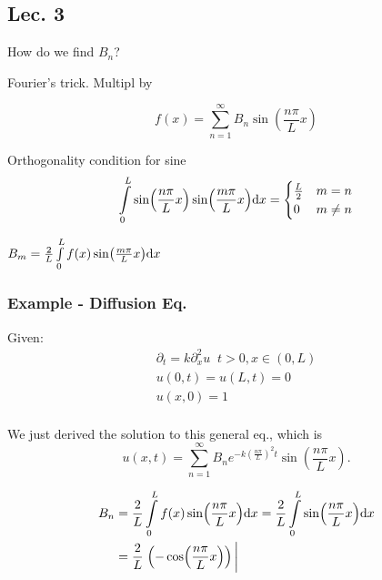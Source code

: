 \begin{quest}
	\item 
\end{quest}




\subsection*{Lec. 3}

How do we find $B_n$?

Fourier's trick.
Multipl by

\[ f(x) = \sum\limits_{n=1}^\infty B_n \sin (\frac{n\pi}{L} x) \]

Orthogonality condition for sine 
\[ 
	\int\limits_0^L \sin(\frac{n\pi}{L} x) \sin(\frac{m\pi}{L} x) \text{d} x 
	= \begin{cases}
		\frac{L}{2} & m=n \\
		0 & m\neq n
	\end{cases}
\]

$ B_m  = \frac{2}{L} \int\limits_0^L f(x) \sin(\frac{m\pi}{L} x) \text{d} x  $

\subsubsection*{Example - Diffusion Eq.}
Given: 
\begin{gather*}
	\partial_t  = k\partial_x^2 u \;\; t>0, x\in (0, L) \\
	u(0, t) = u(L, t) = 0 \\
	u(x, 0) = 1 \\
\end{gather*}

We just derived the solution to this general eq., which is 
\[ u(x, t) = \sum\limits_{n=1}^\infty B_n  e^{-k(\frac{n\pi}{L})^2  t} \sin (\frac{n\pi}{L}x) .\]

\[\begin{aligned}
	B_n &= \frac{2}{L} \int\limits_0^L f(x) \sin(\frac{n\pi}{L} x) \d x 
		= \frac{2}{L} \int\limits_0^L \sin(\frac{n\pi}{L} x) \d x  \\
		&= \frac{2}{L} \eval{
			\left( -\cos (\frac{n\pi}{L} x) \right)
		}
\end{aligned}
	\]

